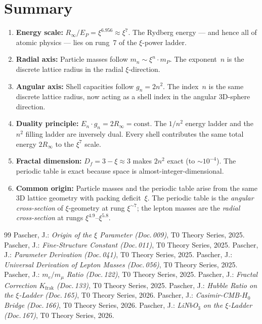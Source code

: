 \section{Summary}
\label{sec:summary}

\begin{enumerate}
  \item \textbf{Energy scale:} $R_\infty / E_P = \xi^{6.956} \approx \xi^7$.
    The Rydberg energy — and hence all of atomic physics — lies on rung~7
    of the $\xi$-power ladder.

  \item \textbf{Radial axis:} Particle masses follow $m_n \sim \xi^{n} \cdot m_P$.
    The exponent~$n$ is the discrete lattice radius in the radial $\xi$-direction.

  \item \textbf{Angular axis:} Shell capacities follow $g_n = 2n^2$.
    The index~$n$ is the same discrete lattice radius, now acting as a shell
    index in the angular 3D-sphere direction.

  \item \textbf{Duality principle:} $E_n \cdot g_n = 2R_\infty = \text{const}$.
    The $1/n^2$ energy ladder and the $n^2$ filling ladder are inversely dual.
    Every shell contributes the same total energy $2R_\infty$ to the $\xi^7$ scale.

  \item \textbf{Fractal dimension:} $D_f = 3 - \xi \approx 3$ makes $2n^2$ exact
    (to $\sim 10^{-4}$). The periodic table is exact because space is
    almost-integer-dimensional.

  \item \textbf{Common origin:} Particle masses and the periodic table arise from
    the same 3D lattice geometry with packing deficit~$\xi$.
    The periodic table is the \emph{angular cross-section} of $\xi$-geometry
    at rung $\xi^{\sim 7}$; the lepton masses are the \emph{radial cross-section}
    at rungs $\xi^{4.9}$–$\xi^{5.8}$.
\end{enumerate}

\begin{thebibliography}{99}
 Pascher, J.: \emph{Origin of the $\xi$ Parameter (Doc.\,009)},
  T0 Theory Series, 2025.
 Pascher, J.: \emph{Fine-Structure Constant (Doc.\,011)},
  T0 Theory Series, 2025.
 Pascher, J.: \emph{Parameter Derivation (Doc.\,041)},
  T0 Theory Series, 2025.
 Pascher, J.: \emph{Universal Derivation of Lepton Masses (Doc.\,056)},
  T0 Theory Series, 2025.
 Pascher, J.: \emph{$m_e/m_\mu$ Ratio (Doc.\,122)},
  T0 Theory Series, 2025.
 Pascher, J.: \emph{Fractal Correction $K_\text{frak}$ (Doc.\,133)},
  T0 Theory Series, 2025.
 Pascher, J.: \emph{Hubble Ratio on the $\xi$-Ladder (Doc.\,165)},
  T0 Theory Series, 2026.
 Pascher, J.: \emph{Casimir-CMB-$H_0$ Bridge (Doc.\,166)},
  T0 Theory Series, 2026.
 Pascher, J.: \emph{LiNbO$_3$ on the $\xi$-Ladder (Doc.\,167)},
  T0 Theory Series, 2026.
\end{thebibliography}
